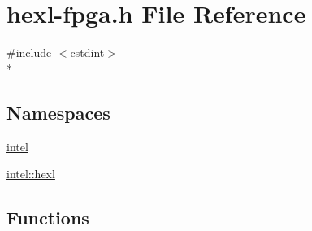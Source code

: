 \hypertarget{hexl-fpga_8h}{\section{hexl-\/fpga.h File Reference}
\label{hexl-fpga_8h}
}
{\ttfamily \#include $<$cstdint$>$}\\*
\subsection*{Namespaces}
\begin{DoxyCompactItemize}
\item 
\hyperlink{namespaceintel}{intel}
\item 
\hyperlink{namespaceintel_1_1hexl}{intel\-::hexl}
\end{DoxyCompactItemize}
\subsection*{Functions}

